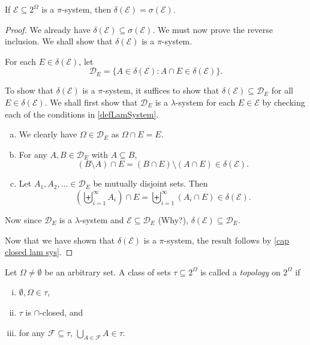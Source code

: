 \begin{theorem}
\label{dynkins pi lam theorem}
    If $\mathcal{E}\subseteq2^\Omega$ is a $\pi$-system, then $\delta(\mathcal{E})=\sigma(\mathcal{E})$.
\end{theorem}
\begin{proof}
    We already have $\delta(\mathcal{E})\subseteq\sigma(\mathcal{E})$. We must now prove the reverse inclusion. We shall show that $\delta(\mathcal{E})$ is a $\pi$-system.
    
    For each $E\in\delta(\mathcal{E})$, let
    $$\mathcal{D}_E=\{A\in\delta(\mathcal{E}) : A\cap E\in\delta(\mathcal{E})\}.$$
    
    To show that $\delta(\mathcal{E})$ is a $\pi$-system, it suffices to show that $\delta(\mathcal{E})\subseteq\mathcal{D}_E$ for all $E\in\delta(\mathcal{E})$. We shall first show that $\mathcal{D}_E$ is a $\lambda$-system for each $E\in\mathcal{E}$ by checking each of the conditions in \cref{defLamSystem}.
    \begin{enumerate}[(a)]
        \item We clearly have $\Omega\in\mathcal{D}_E$ as $\Omega\cap E=E$.
        \item For any $A,B\in\mathcal{D}_E$ with $A\subseteq B$, 
        $$(B\setminus A)\cap E = (B\cap E)\setminus(A\cap E)\in\delta(\mathcal{E}).$$
        \item Let $A_1,A_2,\ldots\in\mathcal{D}_E$ be mutually disjoint sets. Then
        $$\left(\biguplus_{i=1}^\infty A_i\right)\cap E = \biguplus_{i=1}^\infty\left(A_i\cap E\right)\in\delta(\mathcal{E}).$$
    \end{enumerate}
    Now since $\mathcal{D}_E$ is a $\lambda$-system and $\mathcal{E}\subseteq\mathcal{D}_E$ (Why?), $\delta(\mathcal{E})\subseteq\mathcal{D}_E$.
    
    Now that we have shown that $\delta(\mathcal{E})$ is a $\pi$-system, the result follows by \cref{cap closed lam sys}.
\end{proof}

\begin{definition}[Topology]
    Let $\Omega\neq\emptyset$ be an arbitrary set. A class of sets $\tau\subseteq2^\Omega$ is called a \textit{topology} on $2^\Omega$ if
    \begin{enumerate}[(i)]
        \item $\emptyset,\Omega\in\tau$,
        \item $\tau$ is $\cap$-closed, and
        \item for any $\mathcal{F}\subseteq\tau$, $\bigcup_{A\in\mathcal{F}}A\in\tau.$
    \end{enumerate}
\end{definition}

